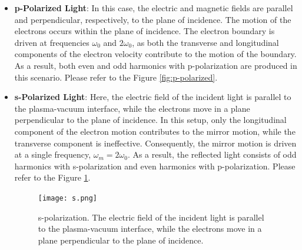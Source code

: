 \begin{itemize}
    \item \textbf{p-Polarized Light}: In this case, the electric and magnetic fields are parallel and perpendicular, respectively, to the plane of incidence. The motion of the electrons occurs within the plane of incidence. The electron boundary is driven at frequencies $\omega_0$ and $2\omega_0$, as both the transverse and longitudinal components of the electron velocity contribute to the motion of the boundary. As a result, both even and odd harmonics with p-polarization are produced in this scenario. Please refer to the Figure \ref{fig:p-polarized}.
    \item \textbf{s-Polarized Light}: Here, the electric field of the incident light is parallel to the plasma-vacuum interface, while the electrons move in a plane perpendicular to the plane of incidence. In this setup, only the longitudinal component of the electron motion contributes to the mirror motion, while the transverse component is ineffective. Consequently, the mirror motion is driven at a single frequency, $\omega_m = 2\omega_0$. As a result, the reflected light consists of odd harmonics with s-polarization and even harmonics with p-polarization. Please refer to the Figure \ref{fig:s-polarized}.
          \begin{figure}[h]
              \centering
              \texttt{[image: s.png]}
              \caption{s-polarization. The electric field of the incident light is parallel to the plasma-vacuum interface, while the electrons move in a plane perpendicular to the plane of incidence. }
              \label{fig:s-polarized}
          \end{figure}
\end{itemize}

